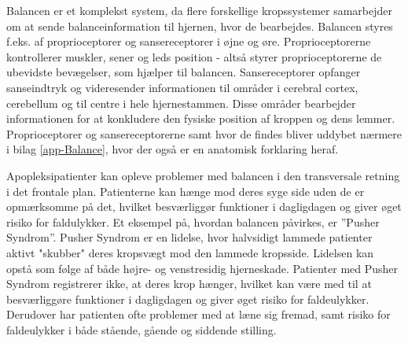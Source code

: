 Balancen er et komplekst system, da flere forskellige kropssystemer samarbejder om at sende balanceinformation til hjernen, hvor de bearbejdes. Balancen styres f.eks. af proprioceptorer og sansereceptorer i øjne og øre. Proprioceptorerne kontrollerer muskler, sener og leds position - altså styrer proprioceptorerne de ubevidste bevægelser, som hjælper til balancen. \cite{Martini2012} Sansereceptorer opfanger sanseindtryk og videresender informationen til områder i cerebral cortex, cerebellum og til centre i hele hjernestammen. Disse områder bearbejder informationen for at konkludere den fysiske position af kroppen og dens lemmer. \cite{Martini2012,Karnath2003} Proprioceptorer og sansereceptorerne samt hvor de findes bliver uddybet nærmere i bilag \ref{app-Balance}, hvor der også er en anatomisk forklaring heraf.

Apopleksipatienter kan opleve problemer med balancen i den transversale retning i det frontale plan. Patienterne kan hænge mod deres syge side uden de er opmærksomme på det, hvilket besværliggør funktioner i dagligdagen og giver øget risiko for faldulykker. Et eksempel på, hvordan balancen påvirkes, er ”Pusher Syndrom”. Pusher Syndrom er en lidelse, hvor halvsidigt lammede patienter aktivt "skubber" deres kropsvægt mod den lammede kropsside. Lidelsen kan opstå som følge af både højre- og venstresidig hjerneskade. Patienter med Pusher Syndrom registrerer ikke, at deres krop hænger, hvilket kan være med til at besværliggøre funktioner i dagligdagen og giver øget risiko for faldeulykker. Derudover har patienten ofte problemer med at læne sig fremad, samt risiko for faldeulykker i både stående, gående og siddende stilling. \cite{Karnath2003} 

